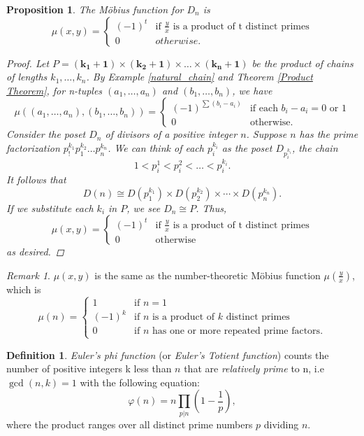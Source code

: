 \documentclass[psamsfonts]{amsart}
\newtheorem{prop}[thm]{Proposition}
\theoremstyle{definition}
\newtheorem{defn}[thm]{Definition}
\theoremstyle{remark}
\newtheorem{rem}[thm]{Remark}
\numberwithin{equation}{section}
\begin{document}
\begin{prop}
The M\"{o}bius function for $D_n$ is 
\begin{equation}
    \mu(x,y) = \begin{cases}
    (-1)^t & \text{if $\frac{y}{x}$ is a product of t distinct primes}\\
    0 & otherwise.
    \end{cases}
\end{equation}
\begin{proof}
 Let $P=(\mathbf{k_1 + 1})\times (\mathbf{k_2 + 1}) \times \dots \times (\mathbf{k_n + 1})$ be the product of chains of lengths $k_1, \dots, k_n$. By Example \ref{natural_chain} and Theorem \ref{Product Theorem}, for n-tuples $(a_1,\dots, a_n)$ and $(b_1, \dots, b_n)$, we have
 \begin{equation*}
     \mu((a_1,\dots, a_n),(b_1, \dots, b_n))=\begin{cases}
     (-1)^{\sum(b_i-a_i)} & \text{if each $b_i-a_i=0$ or $1$}\\
     0 & \text{otherwise}.
     \end{cases}
 \end{equation*}
 Consider the poset $D_n$ of divisors of a positive integer $n$. Suppose $n$ has the prime factorization $p_!^{k_1}p_1^{k_2}\dots p_n^{k_n}$. We can think of each $p_i^{k_i}$ as the poset $D_{p_i^{k_i}}$, the chain \[1<p_i^1<p_i^2<\dots <p_i^{k_i}.\]
 It follows that \[D(n)\cong D(p_1^{k_1})\times D(p_2^{k_2}) \times \cdots\times D(p_n^{k_n}).\]
 If we substitute each $k_i$ in $P$, we see $D_n\cong P$. Thus, 
 \begin{equation}
     \mu(x,y) = \begin{cases}
    (-1)^t & \text{if $\frac{y}{x}$ is a product of t distinct primes}\\
    0 & \text{otherwise}
    \end{cases}
 \end{equation}
 as desired.
\end{proof}
\end{prop}
\begin{rem}
$\mu(x,y)$ is the same as the number-theoretic M\"{o}bius function $\mu(\frac{y}{x})$, which is
\begin{equation}
    \mu(n) = \begin{cases}
    1 & \text{if $n=1$}\\
    (-1)^k & \text{if $n$ is a product of $k$ distinct primes}\\
    0 & \text{if $n$ has one or more repeated prime factors}.
    \end{cases}
\end{equation}
\end{rem}
\begin{defn}\label{euler phi}
\textit{Euler's phi function} (or \textit{Euler's Totient function}) counts the number of positive integers k less than $n$ that are \textit{relatively prime} to n, i.e $\gcd(n,k)=1$ with the following equation:
\begin{equation}
    \varphi(n) = n\prod_{p\vert n}\left(1-\frac{1}{p}\right),
\end{equation}
where the product ranges over all distinct prime numbers $p$ dividing $n$. 
\end{defn}
\end{document}
